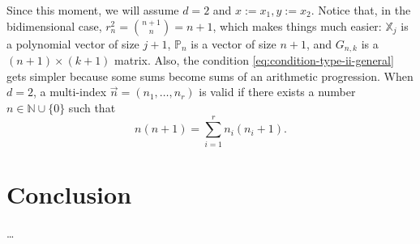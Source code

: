 \documentclass[12pt,a4]{article}
\theoremstyle{plain}
\newcommand{\N}[0]{\mathbb{N}}
\begin{document}
Since this moment, we will assume $d=2$ and $x:=x_1, y:=x_2$. Notice that, in the bidimensional case, $r^2_n = \binom{n+1}{n} = n+1$, which makes things much easier: $\mathbb X_j$ is a polynomial vector of size $j+1$, $\mathbb P_n$ is a vector of size $n+1$, and $G_{n,k}$ is a $(n+1)\times(k+1)$ matrix. Also, the condition \eqref{eq:condition-type-ii-general} gets simpler because some sums become sums of an arithmetic progression. When $d=2$, a multi-index $\vec n =(n_1,\dots,n_r)$ is valid if there exists a number $n\in\N\cup \{0\}$ such that
\begin{equation}
    \label{eq:condition-type-ii}
    n(n+1)=\sum_{i=1}^r n_i (n_i+1).
\end{equation} 



\section{Conclusion}
\dots

\nocite{*}
{}

\end{document}
